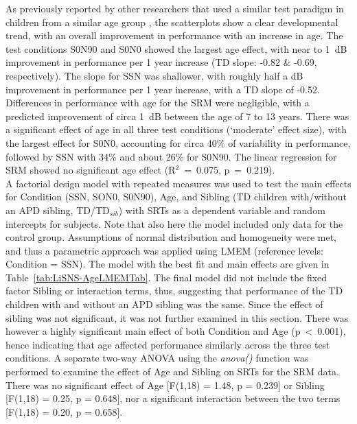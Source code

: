 \documentclass[a4paper, twoside]{templates/ociamthesis}
\begin{document}
As previously reported by other researchers that used a similar test paradigm in children from a similar age group \autocites[e.g.,][]{Cameron2007,Murphy2019}, the scatterplots show a clear developmental trend, with an overall improvement in performance with an increase in age. The test conditions S0N90 and S0N0 showed the largest age effect, with near to 1~dB improvement in performance per 1 year increase (TD slope: -0.82 \& -0.69, respectively). The slope for SSN was shallower, with roughly half a dB improvement in performance per 1 year increase, with a TD slope of -0.52. Differences in performance with age for the SRM were negligible, with a predicted improvement of circa 1~dB between the age of 7 to 13 years. There was a significant effect of age in all three test conditions (`moderate' effect size), with the largest effect for S0N0, accounting for circa 40\% of variability in performance, followed by SSN with 34\% and about 26\% for S0N90. The linear regression for SRM showed no significant age effect (R\(^{2}\)~=~0.075, p~=~0.219).\\

A factorial design model with repeated measures was used to test the main effects for Condition (SSN, SON0, S0N90), Age, and Sibling (TD children with/without an APD sibling, TD/TD\(_{sib}\)) with SRTs as a dependent variable and random intercepts for subjects. Note that also here the model included only data for the control group. Assumptions of normal distribution and homogeneity were met, and thus a parametric approach was applied using LMEM (reference levels: Condition = SSN). The model with the best fit and main effects are given in Table~\ref{tab:LiSNS-AgeLMEMTab}. The final model did not include the fixed factor Sibling or interaction terms, thus, suggesting that performance of the TD children with and without an APD sibling was the same. Since the effect of sibling was not significant, it was not further examined in this section. There was however a highly significant main effect of both Condition and Age (p~\textless~0.001), hence indicating that age affected performance similarly across the three test conditions. A separate two-way ANOVA using the \emph{anova()} function was performed to examine the effect of Age and Sibling on SRTs for the SRM data. There was no significant effect of Age {[}F(1,18) = 1.48, p = 0.239{]} or Sibling {[}F(1,18) = 0.25, p = 0.648{]}, nor a significant interaction between the two terms {[}F(1,18) = 0.20, p = 0.658{]}.\\
\end{document}
